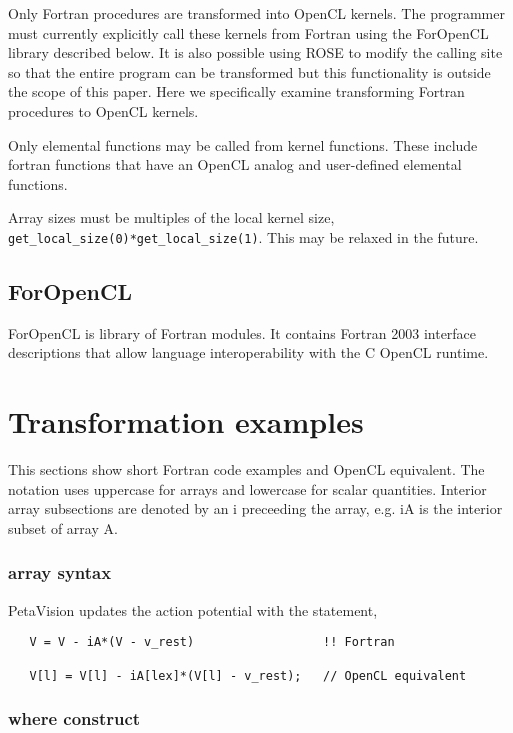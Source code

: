 \documentclass[10pt, conference, compsocconf]{IEEEtran}
\begin{document}
Only Fortran procedures are transformed into OpenCL kernels.  The programmer
must currently explicitly call these kernels from Fortran using the ForOpenCL
library described below.  It is also possible using ROSE to modify the calling
site so that the entire program can be transformed but this functionality is
outside the scope of this paper.  Here we specifically examine transforming
Fortran procedures to OpenCL kernels.

Only elemental functions may be called from kernel functions.  These include
fortran functions that have an OpenCL analog and user-defined elemental functions.

Array sizes must be multiples of the local kernel size,
{\tt get\_local\_size(0)*get\_local\_size(1)}.  This may be relaxed in the future.

\subsection{ForOpenCL}

ForOpenCL is library of Fortran modules.  It contains Fortran 2003 interface
descriptions that allow language interoperability with the C OpenCL runtime.

\section{Transformation examples}

This sections show short Fortran code examples and OpenCL equivalent.
The notation uses uppercase for arrays and lowercase for scalar quantities.
Interior array subsections are denoted by an i preceeding the array, e.g. iA
is the interior subset of array A.

\subsubsection{array syntax}

PetaVision updates the action potential with the statement,

\begin{verbatim}
   V = V - iA*(V - v_rest)                  !! Fortran

   V[l] = V[l] - iA[lex]*(V[l] - v_rest);   // OpenCL equivalent
\end{verbatim}

\subsubsection{where construct}
\end{document}
